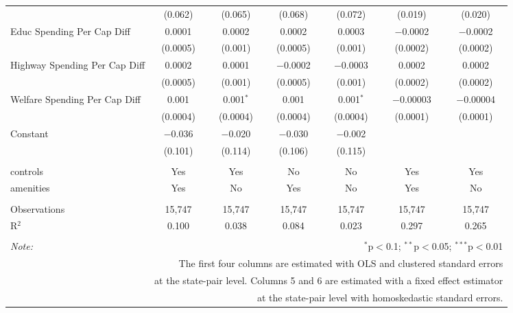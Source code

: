 \begin{table}[!htbp]
\begin{tabular}{@{\extracolsep{5pt}}lcccccc}
  & (0.062) & (0.065) & (0.068) & (0.072) & (0.019) & (0.020) \\ 
  Educ Spending Per Cap Diff & 0.0001 & 0.0002 & 0.0002 & 0.0003 & $-$0.0002 & $-$0.0002 \\ 
  & (0.0005) & (0.001) & (0.0005) & (0.001) & (0.0002) & (0.0002) \\ 
  Highway Spending Per Cap Diff & 0.0002 & 0.0001 & $-$0.0002 & $-$0.0003 & 0.0002 & 0.0002 \\ 
  & (0.0005) & (0.001) & (0.0005) & (0.001) & (0.0002) & (0.0002) \\ 
  Welfare Spending Per Cap Diff & 0.001 & 0.001$^{*}$ & 0.001 & 0.001$^{*}$ & $-$0.00003 & $-$0.00004 \\ 
  & (0.0004) & (0.0004) & (0.0004) & (0.0004) & (0.0001) & (0.0001) \\ 
  Constant & $-$0.036 & $-$0.020 & $-$0.030 & $-$0.002 &  &  \\ 
  & (0.101) & (0.114) & (0.106) & (0.115) &  &  \\ 
 \hline \\[-1.8ex] 
controls & Yes & Yes & No & No & Yes & Yes \\ 
amenities & Yes & No & Yes & No & Yes & No \\ 
\hline \\[-1.8ex] 
Observations & 15,747 & 15,747 & 15,747 & 15,747 & 15,747 & 15,747 \\ 
R$^{2}$ & 0.100 & 0.038 & 0.084 & 0.023 & 0.297 & 0.265 \\ 
\hline 
\hline \\[-1.8ex] 
\textit{Note:}  & \multicolumn{6}{r}{$^{*}$p$<$0.1; $^{**}$p$<$0.05; $^{***}$p$<$0.01} \\ 
 & \multicolumn{6}{r}{The first four columns are estimated with OLS and clustered standard errors} \\ 
 & \multicolumn{6}{r}{at the state-pair level. Columns 5 and 6 are estimated with a fixed effect estimator} \\ 
 & \multicolumn{6}{r}{at the state-pair level with homoskedastic standard errors.} \\ 
\end{tabular} 
\end{table} 
